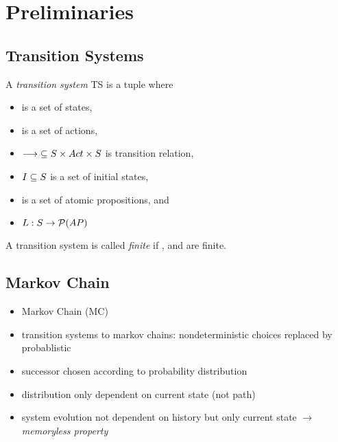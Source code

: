 \documentclass[preview]{standalone}
\begin{document}
	
\section{Preliminaries}

\subsection{Transition Systems}


\begin{definition}
	A \emph{transition system} TS is a tuple \transitionsystem where
	\begin{itemize}
		\item \states is a set of states,
		\item \actions is a set of actions,
		\item ${\longrightarrow} \subseteq {S} \times {Act} \times {S}$ is transition relation,
		\item ${I} \subseteq {S}$ is a set of initial states,
		\item \atomicprops is a set of atomic propositions, and
		\item ${L} : {S} \to {\mathcal{P}(\ensuremath{{AP}})}$
	\end{itemize}

	A transition system is called \emph{finite} if \states, \atomicprops and  are finite.
\end{definition}


\subsection{Markov Chain}

\begin{itemize}
	\item Markov Chain (MC)
	\item transition systems to markov chains: nondeterministic choices replaced by probablistic
	\item successor chosen according to probability distribution
	\item distribution only dependent on current state \state (not path)
	\item system evolution not dependent on history but only current state $\to$ \emph{memoryless property}
\end{itemize}
\end{document}
